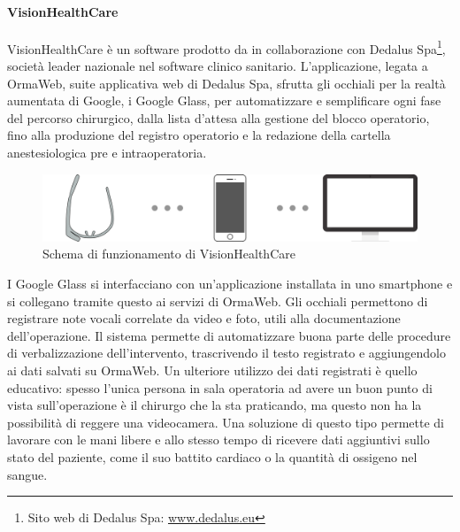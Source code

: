    \paragraph{VisionHealthCare}
   VisionHealthCare è un software prodotto da \nomeAzienda{} in collaborazione con Dedalus Spa\footnote{Sito web di Dedalus Spa: \href{http://www.dedalus.eu}{www.dedalus.eu}}, società leader nazionale nel software clinico sanitario. L'applicazione, legata a OrmaWeb, suite applicativa web di Dedalus Spa, sfrutta gli occhiali per la realtà aumentata di Google, i Google Glass, per automatizzare e semplificare ogni fase del percorso chirurgico, dalla lista d'attesa alla gestione del blocco operatorio, fino alla produzione del registro operatorio e la redazione della cartella anestesiologica pre e intraoperatoria.
   \begin{figure}[H]
      \begin{center}
         \includegraphics[width=15cm,keepaspectratio]{immagini/visionhealthcare-schema}
      \end{center}
      \caption{Schema di funzionamento di VisionHealthCare}\label{schemavisionhealthcare}
   \end{figure}
   I Google Glass si interfacciano con un'applicazione installata in uno smartphone e si collegano tramite questo ai servizi di OrmaWeb.
   Gli occhiali permettono di registrare note vocali correlate da video e foto, utili alla documentazione dell'operazione. Il sistema permette di automatizzare buona parte delle procedure di verbalizzazione dell'intervento, trascrivendo il testo registrato e aggiungendolo ai dati salvati su OrmaWeb. Un ulteriore utilizzo dei dati registrati è quello educativo: spesso l'unica persona in sala operatoria ad avere un buon punto di vista sull'operazione è il chirurgo che la sta praticando, ma questo non ha la possibilità di reggere una videocamera. Una soluzione di questo tipo permette di lavorare con le mani libere e allo stesso tempo di ricevere dati aggiuntivi sullo stato del paziente, come il suo battito cardiaco o la quantità di ossigeno nel sangue.

